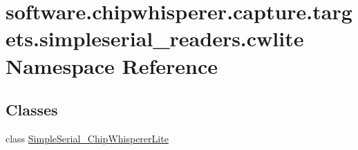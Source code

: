 \hypertarget{namespacesoftware_1_1chipwhisperer_1_1capture_1_1targets_1_1simpleserial__readers_1_1cwlite}{}\section{software.\+chipwhisperer.\+capture.\+targets.\+simpleserial\+\_\+readers.\+cwlite Namespace Reference}
\label{namespacesoftware_1_1chipwhisperer_1_1capture_1_1targets_1_1simpleserial__readers_1_1cwlite}
\subsection*{Classes}
\begin{DoxyCompactItemize}
\item 
class \hyperlink{classsoftware_1_1chipwhisperer_1_1capture_1_1targets_1_1simpleserial__readers_1_1cwlite_1_1SimpleSerial__ChipWhispererLite}{Simple\+Serial\+\_\+\+Chip\+Whisperer\+Lite}
\end{DoxyCompactItemize}

